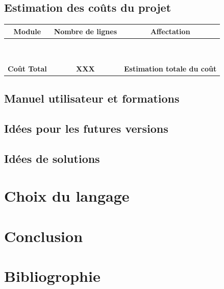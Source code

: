 \documentclass[a4paper,11pt]{article}
\begin{document}
		\subsection{Estimation des coûts du projet}
			\begin{tabular}{|c|c|c|}
				\hline Module & Nombre de lignes & Affectation \\
				\hline 	 &  &  \\
				\hline 	 &  &  \\
				\hline 	 &  &  \\
				\hline 	 &  &  \\
				\hline   &  &  \\
				\hline 	 &  &  \\
				\hline 	 &  &  \\
				\hline 	 &  &  \\
				\hline 	 &  &  \\
				\hline \textbf{Coût Total} & \textbf{XXX} & \textbf{Estimation totale du coût}\\
				\hline 	
				\end{tabular}\vspace{1em}
				
		\subsection{Manuel utilisateur et formations}
		
		\subsection{Idées pour les futures versions}
		
		\subsection{Idées de solutions}
	
	\section{Choix du langage}
	
	\section*{Conclusion}
	
	\section*{Bibliogrophie}
	
\end{document}
